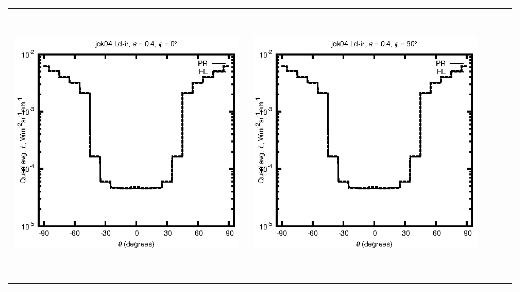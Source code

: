 \documentclass[10pt,a4paper]{article}
\begin{document}
\begin{adjustwidth}{-1.2in}{-1.2in}
\begin{tabular}{c c c c}
\includegraphics[height=7cm]{../eps/jok04_Ld_ir_fwd.eps} &
\includegraphics[height=7cm]{../eps/jok04_Ld_ir_cross.eps} \\
\end{tabular}

\pagebreak


\end{adjustwidth}
\end{document}
